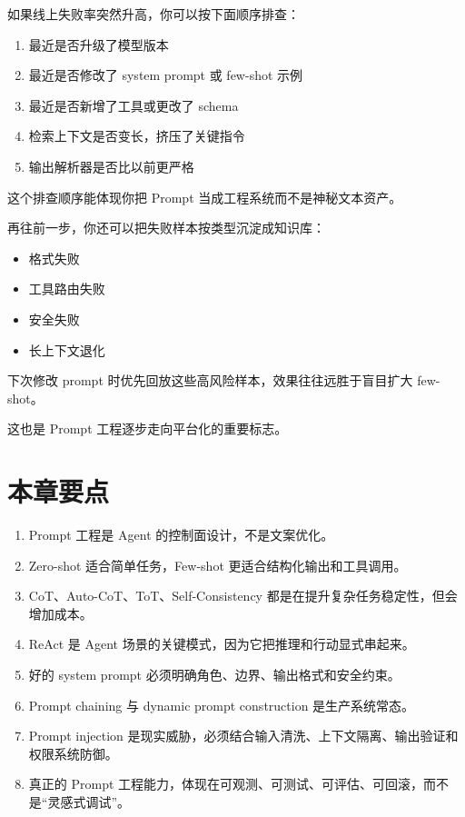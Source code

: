 如果线上失败率突然升高，你可以按下面顺序排查：


\begin{enumerate}[leftmargin=2em]
\item 最近是否升级了模型版本
\item 最近是否修改了 system prompt 或 few-shot 示例
\item 最近是否新增了工具或更改了 schema
\item 检索上下文是否变长，挤压了关键指令
\item 输出解析器是否比以前更严格
\end{enumerate}

这个排查顺序能体现你把 Prompt 当成工程系统而不是神秘文本资产。


再往前一步，你还可以把失败样本按类型沉淀成知识库：


\begin{itemize}[leftmargin=2em]
\item 格式失败
\item 工具路由失败
\item 安全失败
\item 长上下文退化
\end{itemize}

下次修改 prompt 时优先回放这些高风险样本，效果往往远胜于盲目扩大 few-shot。

这也是 Prompt 工程逐步走向平台化的重要标志。


\section{本章要点}

\begin{enumerate}[leftmargin=2em]
\item Prompt 工程是 Agent 的控制面设计，不是文案优化。
\item Zero-shot 适合简单任务，Few-shot 更适合结构化输出和工具调用。
\item CoT、Auto-CoT、ToT、Self-Consistency 都是在提升复杂任务稳定性，但会增加成本。
\item ReAct 是 Agent 场景的关键模式，因为它把推理和行动显式串起来。
\item 好的 system prompt 必须明确角色、边界、输出格式和安全约束。
\item Prompt chaining 与 dynamic prompt construction 是生产系统常态。
\item Prompt injection 是现实威胁，必须结合输入清洗、上下文隔离、输出验证和权限系统防御。
\item 真正的 Prompt 工程能力，体现在可观测、可测试、可评估、可回滚，而不是``灵感式调试''。
\end{enumerate}

